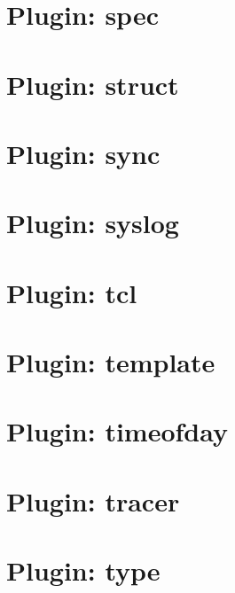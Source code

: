 \documentclass[twoside]{book}
\newcommand{\+}{\discretionary{\mbox{\scriptsize$\hookleftarrow$}}{}{}}
\begin{document}
\chapter{Plugin\+: spec}
\label{md_src_plugins_spec_README}
\hypertarget{md_src_plugins_spec_README}{}

\chapter{Plugin\+: struct}
\label{md_src_plugins_struct_README}
\hypertarget{md_src_plugins_struct_README}{}

\chapter{Plugin\+: sync}
\label{md_src_plugins_sync_README}
\hypertarget{md_src_plugins_sync_README}{}

\chapter{Plugin\+: syslog}
\label{md_src_plugins_syslog_README}
\hypertarget{md_src_plugins_syslog_README}{}

\chapter{Plugin\+: tcl}
\label{md_src_plugins_tcl_README}
\hypertarget{md_src_plugins_tcl_README}{}

\chapter{Plugin\+: template}
\label{md_src_plugins_template_README}
\hypertarget{md_src_plugins_template_README}{}

\chapter{Plugin\+: timeofday}
\label{md_src_plugins_timeofday_README}
\hypertarget{md_src_plugins_timeofday_README}{}

\chapter{Plugin\+: tracer}
\label{md_src_plugins_tracer_README}
\hypertarget{md_src_plugins_tracer_README}{}

\chapter{Plugin\+: type}
\label{md_src_plugins_type_README}
\hypertarget{md_src_plugins_type_README}{}

\end{document}

